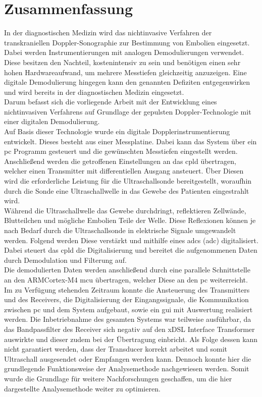 \chapter*{Zusammenfassung}
In der diagnostischen Medizin wird das nichtinvasive Verfahren der transkraniellen Doppler-Sonographie zur Bestimmung von Embolien eingesetzt. Dabei werden Instrumentierungen mit analogen Demodulierungen verwendet. Diese besitzen den Nachteil, kostenintensiv zu sein und benötigen einen sehr hohen Hardwareaufwand, um mehrere Messtiefen gleichzeitig anzuzeigen. Eine digitale Demodulierung hingegen kann den genannten Defiziten entgegenwirken und wird bereits in der diagnostischen Medizin eingesetzt.\\
Darum befasst sich die vorliegende Arbeit mit der Entwicklung eines nichtinvasiven Verfahrens auf Grundlage der gepulsten Doppler-Technologie mit einer digitalen Demodulierung.\\
Auf Basis dieser Technologie wurde ein digitale Dopplerinstrumentierung entwickelt. Dieses besteht aus einer Messplatine. Dabei kann das System über ein \ac{pc} Programm gesteuert und die gewünschten Messtiefen eingestellt werden.
Anschließend werden die getroffenen Einstellungen an das \ac{cpld} übertragen, welcher einen Transmitter mit differentiellen Ausgang ansteuert. 
Über Diesen wird die erforderliche Leistung für die Ultraschallsonde bereitgestellt, woraufhin durch die Sonde eine Ultraschallwelle in das Gewebe des Patienten eingestrahlt wird.\\
Während die Ultraschallwelle das Gewebe durchdringt, reflektieren Zellwände, Blutteilchen und mögliche Embolien Teile der Welle. 
Diese Reflexionen können je nach Bedarf durch die Ultraschallsonde in elektrische Signale umgewandelt werden. Folgend werden Diese verstärkt und mithilfe eines \acl{adc}s (\ac{adc}) digitalisiert. Dabei steuert das \ac{cpld} die Digitalisierung und bereitet die aufgenommenen Daten durch Demodulation und Filterung auf.\\
Die demodulierten Daten werden anschließend durch eine parallele Schnittstelle an den ARM\SymbReg Cortex\SymbReg-M4 \ac{mcu} übertragen, welcher Diese an den \ac{pc} weiterreicht.\\
Im zu Verfügung stehenden Zeitraum konnte die Ansteuerung des Transmitters und des Receivers, die Digitalisierung der Eingangssignale, die Kommunikation zwischen \ac{pc} und dem System aufgebaut, sowie ein \ac{gui} mit Auswertung realisiert werden. 
Die Inbetriebnahme des gesamten Systems war teilweise ausführbar, da das Bandpassfilter des Receiver sich negativ auf den xDSL Interface Transformer auswirkte und dieser zudem bei der Übertragung einbricht. Als Folge dessen kann nicht garantiert werden, dass der Transducer korrekt arbeitet und somit Ultraschall ausgesendet oder Empfangen werden kann.
Dennoch konnte hier die grundlegende Funktionsweise der Analysemethode nachgewiesen werden. Somit wurde die Grundlage für weitere Nachforschungen geschaffen, um die hier dargestellte Analysemethode weiter zu optimieren.

